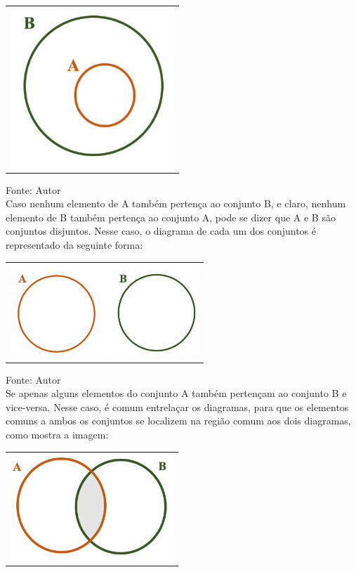 \begin{multicols*}{2}
        	\begin{tabular}{@{}c@{}}
      		\includegraphics[height=60mm]{assets/Conjunto Contido.png}
    		\end{tabular}
    		
		Fonte: Autor\\
		        
		Caso nenhum elemento de A também pertença ao conjunto B, e claro, nenhum elemento de B também pertença ao conjunto A, pode se dizer que A e B são conjuntos disjuntos. Nesse caso, o diagrama de cada um dos conjuntos é representado da seguinte forma:\\
		
        	\begin{tabular}{@{}c@{}}
      		\includegraphics[height=35mm]{assets/Conjunto Disjunto.png}
    		\end{tabular}
    		
    		Fonte: Autor\\
    		
    	Se apenas alguns elementos do conjunto A também pertençam ao conjunto B e vice-versa. Nesse caso, é comum entrelaçar os diagramas, para que os elementos comuns a ambos os conjuntos se localizem na região comum aos dois diagramas, como mostra a imagem:\\
    	
        	\begin{tabular}{@{}c@{}}
      		\includegraphics[height=40mm]{assets/Conjunto Intersecção.png}
    		\end{tabular}   	
		

\end{multicols*}
